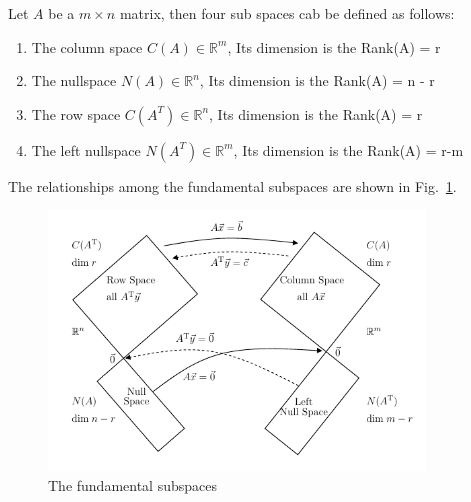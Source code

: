 \documentclass[12pt]{article}%
\begin{document}
Let $A$ be a $m\times n$ matrix, then four sub spaces cab be defined as follows:
\begin{enumerate}
    \item The column space $C(A) \in \mathbb{R}^m$, Its dimension is the Rank(A) = r  
    \item The nullspace $N(A) \in \mathbb{R}^n$, Its dimension is the Rank(A) = n - r  
    \item The row space $C(A^T) \in \mathbb{R}^n$, Its dimension is the Rank(A) = r  
    \item The left nullspace $N(A^T) \in \mathbb{R}^m$, Its dimension is the Rank(A) = r-m  
\end{enumerate} The relationships among the fundamental subspaces are shown in Fig.~\ref{f:sub_spaces}.

\begin{figure}[!ht]
\begin{center}
\includegraphics[width=10cm]{sub_spaces.png}
\caption{\label{f:sub_spaces} The fundamental subspaces~\cite{rose1982linear}}
\end{center}
\end{figure} 
\end{document}
